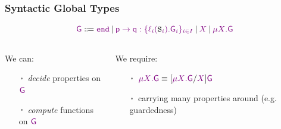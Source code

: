\begin{frame}[fragile]
  \frametitle{Syntactic Global Types}
  \[
    \G \Coloneqq
    \gend
    \SEP \msgi{\p}{\q}{\ell}{\tS}{\G}
    \SEP \gX
    \SEP \grec{\gX}{\G}
  \]
  \vfill
  \begin{columns}
    \begin{column}[t]{.49\textwidth}
      \begin{greenbox}{}
        \small
        We can:
        \begin{itemize}%
        \item[$\itm$] \emph{decide} properties on $\G$
        \item[$\itm$] \emph{compute} functions on $\G$
        \end{itemize}
      \end{greenbox}
    \end{column}
    \begin{column}[t]{.49\textwidth}
        \begin{redbox}
          \small
          We require:
          \begin{itemize}%
          \item[$\itm$] $\grec{\gX}{\G} \equiv [\grec{\gX}{\G}/\gX]\G$
          \item[$\itm$] carrying many properties around (e.g. guardedness)
          \end{itemize}
        \end{redbox}
      \end{column}
    \end{columns}
\end{frame}

